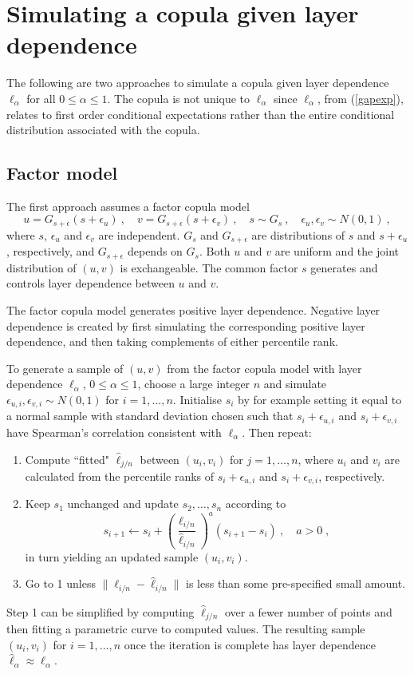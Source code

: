 \documentclass[authoryear]{elsarticle}
\newcommand{\eps}{\epsilon}
\newcommand{\cq}{\ ,\quad }
\newcommand{\eref}[1]{(\ref{#1})}
\begin{document}
\section{Simulating a copula given layer dependence}\label{smodeling}

The following are two approaches to simulate a copula given layer dependence $\ell_\alpha$ for all $0\leq\alpha\leq 1$. The copula is not unique to $\ell_\alpha$ since $\ell_\alpha$, from \eref{gapexp}, relates to first order conditional expectations rather than the entire conditional distribution associated with the copula.


\subsection{Factor model}

The first approach assumes a factor copula model
$$
u=G_{s+\eps}(s+\eps_u) \cq
v=G_{s+\eps}(s+\eps_v) \cq
 s \sim G_s   \cq \eps_u, \eps_v \sim N(0,1) \ ,
$$
where $s$, $\eps_u$ and $\eps_v$ are independent. $G_s$ and $G_{s+\eps}$ are distributions of $s$ and $s+\eps_u$, respectively, and $G_{s+\eps}$ depends on $G_s$. Both $u$ and $v$ are uniform and the joint distribution of $(u,v)$ is exchangeable. The common factor $s$ generates and controls layer dependence between $u$ and $v$.

The factor copula model generates positive layer dependence. Negative layer dependence is created by first simulating the corresponding positive layer dependence, and then taking complements of either percentile rank.

To generate a sample of $(u,v)$ from the factor copula model with layer dependence $\ell_\alpha$, $0\le\alpha\le 1$,  choose a large integer $n$  and simulate $\eps_{u,i},\eps_{v,i}\sim N(0,1)$ for $i=1,\ldots,n$.  Initialise $s_i$ by for example setting it equal to a normal sample with standard deviation chosen such that $s_i+\eps_{u,i}$ and $s_i+\eps_{v,i}$ have Spearman's correlation consistent with $\ell_\alpha$. Then repeat:
\begin{enumerate}

\item Compute ``fitted"  $\hat\ell_{j/n}$ between  $(u_i,v_i)$ for $j=1,\ldots,n$, where $u_i$ and $v_i$ are calculated from the percentile ranks of $s_i+\eps_{u,i}$ and $s_i+\eps_{v,i}$, respectively.

\item Keep $s_1$ unchanged and update  $s_2,\ldots,s_n$ according to
$$
s_{i+1}  \leftarrow s_{i}+  \left(\frac{\ell_{i/n}}{\hat \ell_{i/n}}\right)^a(s_{i+1}-s_i)\cq a>0\;,
$$
in turn yielding an updated sample $(u_i,v_i)$.

\item Go to 1 unless $\|\ell_{i/n} -  \hat\ell_{i/n} \|$ is less than some pre-specified small amount.

\end{enumerate}
Step 1 can be simplified by computing $\hat \ell_{j/n}$ over a fewer number of points and then fitting a parametric curve to computed values. The resulting sample $(u_i,v_i)$ for   $i=1,\ldots,n$ once the iteration is complete has  layer dependence $\hat\ell_\alpha\approx\ell_\alpha$.
\end{document}
